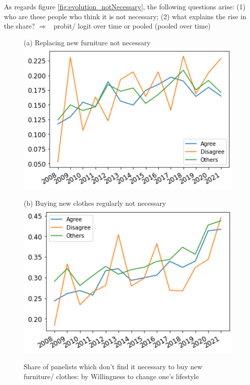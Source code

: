 \documentclass[12pt]{article}
\newcommand{\ar}{$\Rightarrow$ \ }
\begin{document}
As regards figure \ref{fig:evolution_notNecessary}, the following questions arise: 
(1) who are these people who think it is not necessary;
(2) what explains the rise in the share? \ar probit/ logit over time or pooled (pooled over time)

\begin{figure}[h!!]
	\centering	
	\caption{Share of panelists which don't find it necessary to buy new furniture/ clothes: by Willingness to change one's lifestyle}\label{fig:evolution_notNecessary_bygroup}	
	\begin{minipage}[h!!]{0.32\textwidth}  
		\centering\footnotesize{(a) Replacing new furniture not necessary}
		\includegraphics[width=1\textwidth]{../codding_data/results/liss/broad_groups_notnecessaryqk20a175_ci307.png}
	\end{minipage}
	\begin{minipage}[h!!]{0.32\textwidth}
		\centering\footnotesize{(b) Buying new clothes regularly not necessary}
		\includegraphics[width=1\textwidth]{../codding_data/results/liss/broad_groups_notnecessaryqk20a175_ci306.png}
	\end{minipage}
\end{figure}
\end{document}
